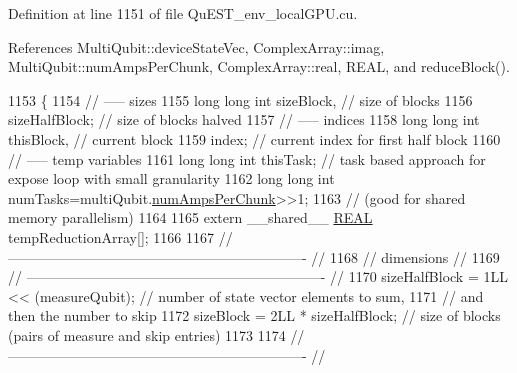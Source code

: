 Definition at line 1151 of file Qu\+E\+S\+T\+\_\+env\+\_\+local\+G\+P\+U.\+cu.



References Multi\+Qubit\+::device\+State\+Vec, Complex\+Array\+::imag, Multi\+Qubit\+::num\+Amps\+Per\+Chunk, Complex\+Array\+::real, R\+E\+AL, and reduce\+Block().


\begin{DoxyCode}
1153 \{
1154     \textcolor{comment}{// ----- sizes}
1155     \textcolor{keywordtype}{long} \textcolor{keywordtype}{long} \textcolor{keywordtype}{int} sizeBlock,                                           \textcolor{comment}{// size of blocks}
1156          sizeHalfBlock;                                       \textcolor{comment}{// size of blocks halved}
1157     \textcolor{comment}{// ----- indices}
1158     \textcolor{keywordtype}{long} \textcolor{keywordtype}{long} \textcolor{keywordtype}{int} thisBlock,                                           \textcolor{comment}{// current block}
1159          index;                                               \textcolor{comment}{// current index for first half block}
1160     \textcolor{comment}{// ----- temp variables}
1161     \textcolor{keywordtype}{long} \textcolor{keywordtype}{long} \textcolor{keywordtype}{int} thisTask;                                   \textcolor{comment}{// task based approach for expose loop with
       small granularity}
1162     \textcolor{keywordtype}{long} \textcolor{keywordtype}{long} \textcolor{keywordtype}{int} numTasks=multiQubit.\mbox{\hyperlink{structMultiQubit_a1cad83601a78635dd278259c7ed54f18}{numAmpsPerChunk}}>>1;
1163     \textcolor{comment}{// (good for shared memory parallelism)}
1164 
1165     \textcolor{keyword}{extern} \_\_shared\_\_ \mbox{\hyperlink{QuEST__precision_8h_a4b654506f18b8bfd61ad2a29a7e38c25}{REAL}} tempReductionArray[];
1166 
1167     \textcolor{comment}{// ---------------------------------------------------------------- //}
1168     \textcolor{comment}{//            dimensions                                            //}
1169     \textcolor{comment}{// ---------------------------------------------------------------- //}
1170     sizeHalfBlock = 1LL << (measureQubit);                       \textcolor{comment}{// number of state vector elements to sum,}
1171     \textcolor{comment}{// and then the number to skip}
1172     sizeBlock     = 2LL * sizeHalfBlock;                           \textcolor{comment}{// size of blocks (pairs of measure and
       skip entries)}
1173 
1174     \textcolor{comment}{// ---------------------------------------------------------------- //}

\end{DoxyCode}
